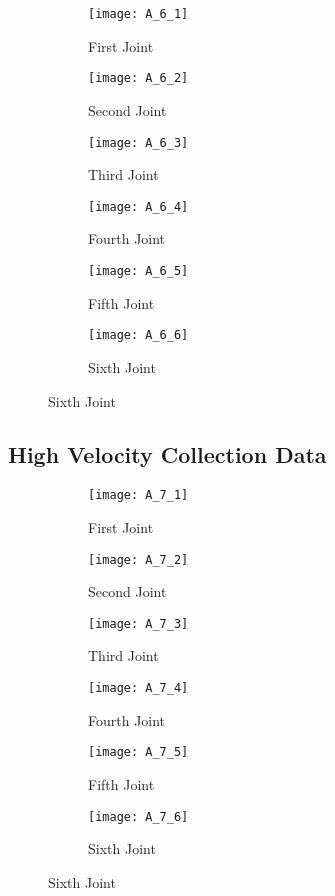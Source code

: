 \begin{figure}[H]
  \caption{Denso Gain Identification}
  \begin{subfigure}[t]{0.5\textwidth}
    \centering
    \texttt{[image: A\_6\_1]} 
    \caption{First Joint}
  \end{subfigure}
  \begin{subfigure}[t]{0.5\textwidth}
    \centering
    \texttt{[image: A\_6\_2]}
    \caption{Second Joint}
  \end{subfigure}
  \begin{subfigure}[t]{0.5\textwidth}
    \centering
    \texttt{[image: A\_6\_3]}
    \caption{Third Joint}
  \end{subfigure}
  \begin{subfigure}[t]{0.5\textwidth}
    \centering
    \texttt{[image: A\_6\_4]}
    \caption{Fourth Joint}
  \end{subfigure}
  \begin{subfigure}[t]{0.5\textwidth}
    \centering
    \texttt{[image: A\_6\_5]}
    \caption{Fifth Joint}
  \end{subfigure}
  \begin{subfigure}[t]{0.5\textwidth}
    \centering
    \texttt{[image: A\_6\_6]}
    \caption{Sixth Joint}
    \label{fig:denso gain sixth joint}
  \end{subfigure}
\end{figure}


\subsection*{High Velocity Collection Data}
\begin{figure}[H]
  \caption{Friction Identification}  
  \label{fig:appendix high vel fric}
  \begin{subfigure}[t]{0.5\textwidth}
    \centering
    \texttt{[image: A\_7\_1]} 
    \caption{First Joint}
  \end{subfigure}
  \begin{subfigure}[t]{0.5\textwidth}
    \centering
    \texttt{[image: A\_7\_2]}
    \caption{Second Joint}
  \end{subfigure}
  \begin{subfigure}[t]{0.5\textwidth}
    \centering
    \texttt{[image: A\_7\_3]}
    \caption{Third Joint}
  \end{subfigure}
  \begin{subfigure}[t]{0.5\textwidth}
    \centering
    \texttt{[image: A\_7\_4]}
    \caption{Fourth Joint}
  \end{subfigure}
  \begin{subfigure}[t]{0.5\textwidth}
    \centering
    \texttt{[image: A\_7\_5]}
    \caption{Fifth Joint}
  \end{subfigure}
  \begin{subfigure}[t]{0.5\textwidth}
    \centering
    \texttt{[image: A\_7\_6]}
    \caption{Sixth Joint}
  \end{subfigure}
\end{figure}

